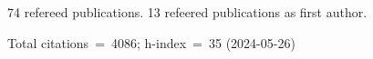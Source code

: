 74 refereed publications. 13 refeered publications as first author.

Total citations~=~4086; h-index~=~35 (2024-05-26)